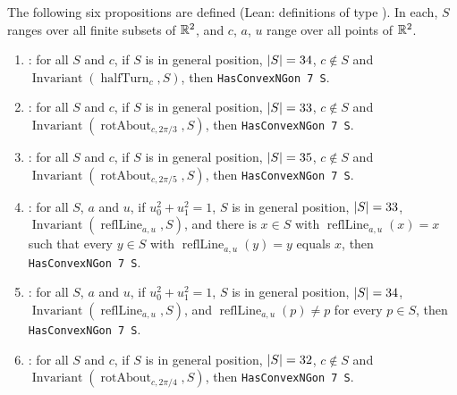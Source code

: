 \begin{definition}\label{sr:def:classes}
The following six propositions are defined (Lean: definitions of type ). In each, $S$ ranges over all finite
subsets of $\mathbb R^2$, and $c$, $a$, $u$ range over all points of $\mathbb R^2$.
\begin{enumerate}[label=(\arabic*)]
\item {}: for all $S$ and $c$, if $S$ is in general position, $\lvert S\rvert=34$, $c\notin S$ and
  $\operatorname{Invariant}(\operatorname{halfTurn}_c,S)$, then \texttt{HasConvexNGon 7 S}.
\item {}: for all $S$ and $c$, if $S$ is in general position, $\lvert S\rvert=33$, $c\notin S$ and
  $\operatorname{Invariant}(\operatorname{rotAbout}_{c,2\pi/3},S)$, then \texttt{HasConvexNGon 7 S}.
\item {}: for all $S$ and $c$, if $S$ is in general position, $\lvert S\rvert=35$, $c\notin S$ and
  $\operatorname{Invariant}(\operatorname{rotAbout}_{c,2\pi/5},S)$, then \texttt{HasConvexNGon 7 S}.
\item {}: for all $S$, $a$ and $u$, if $u_0^2+u_1^2=1$, $S$ is in general position, $\lvert S\rvert=33$,
  $\operatorname{Invariant}(\operatorname{reflLine}_{a,u},S)$, and there is $x\in S$ with
  $\operatorname{reflLine}_{a,u}(x)=x$ such that every $y\in S$ with $\operatorname{reflLine}_{a,u}(y)=y$ equals $x$, then
  \texttt{HasConvexNGon 7 S}.
\item {}: for all $S$, $a$ and $u$, if $u_0^2+u_1^2=1$, $S$ is in general position, $\lvert S\rvert=34$,
  $\operatorname{Invariant}(\operatorname{reflLine}_{a,u},S)$, and $\operatorname{reflLine}_{a,u}(p)\ne p$ for every
  $p\in S$, then \texttt{HasConvexNGon 7 S}.
\item {}: for all $S$ and $c$, if $S$ is in general position, $\lvert S\rvert=32$, $c\notin S$ and
  $\operatorname{Invariant}(\operatorname{rotAbout}_{c,2\pi/4},S)$, then \texttt{HasConvexNGon 7 S}.
\end{enumerate}

\end{definition}
